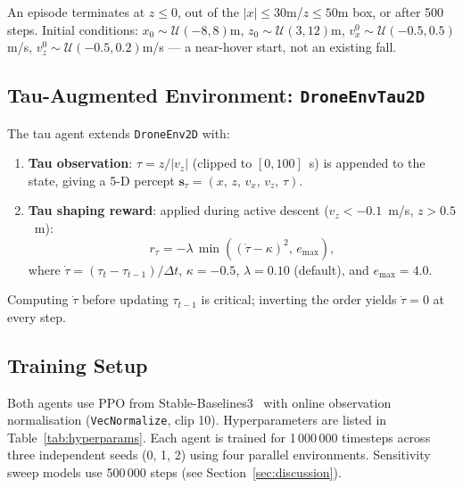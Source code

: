 \documentclass[10pt,twocolumn]{article}
\begin{document}
An episode terminates at $z \le 0$, out of the $|x|\le30$m/$z\le50$m box,
or after 500 steps.
Initial conditions: $x_0\sim\mathcal{U}(-8,8)$m, $z_0\sim\mathcal{U}(3,12)$m,
$v_x^0\sim\mathcal{U}(-0.5,0.5)$m/s, $v_z^0\sim\mathcal{U}(-0.5,0.2)$m/s ---
a near-hover start, not an existing fall.

\subsection{Tau-Augmented Environment: \texttt{DroneEnvTau2D}}

The tau agent extends \texttt{DroneEnv2D} with:
\begin{enumerate}[noitemsep,leftmargin=*]
  \item \textbf{Tau observation}: $\tau = z/|v_z|$ (clipped to $[0,100]$~s)
        is appended to the state, giving a 5-D percept
        $\mathbf{s}_\tau = (x,\,z,\,v_x,\,v_z,\,\tau)$.
  \item \textbf{Tau shaping reward}: applied during active descent
        ($v_z < -0.1$~m/s, $z > 0.5$~m):
        \begin{equation}
          r_\tau = -\lambda\,\min\!\left((\dot{\tau} - \kappa)^2,\,e_{\max}\right),
          \label{eq:tau_reward}
        \end{equation}
        where $\dot{\tau} = (\tau_t - \tau_{t-1})/\Delta t$,
        $\kappa = -0.5$, $\lambda = 0.10$ (default), and $e_{\max} = 4.0$.
\end{enumerate}

Computing $\dot{\tau}$ before updating $\tau_{t-1}$ is critical; inverting
the order yields $\dot{\tau} = 0$ at every step.

\subsection{Training Setup}

Both agents use PPO from Stable-Baselines3~\cite{raffin2021sb3} with online
observation normalisation (\texttt{VecNormalize}, clip 10).
Hyperparameters are listed in Table~\ref{tab:hyperparams}.
Each agent is trained for 1\,000\,000 timesteps across three independent seeds
(0, 1, 2) using four parallel environments.
Sensitivity sweep models use 500\,000 steps (see Section~\ref{sec:discussion}).
\end{document}
